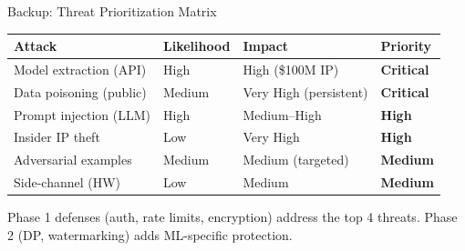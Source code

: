 \documentclass[aspectratio=169, 12pt]{beamer}
\begin{document}
\appendix

\begin{frame}{Backup: Threat Prioritization Matrix}

\footnotesize
\renewcommand{\arraystretch}{1.15}
\begin{tabular}{@{}llll@{}}
  \toprule
  \textbf{Attack} & \textbf{Likelihood} & \textbf{Impact} & \textbf{Priority} \\
  \midrule
  Model extraction (API)   & High   & High (\$100M IP)      & \textcolor{errorstroke}{\textbf{Critical}} \\
  Data poisoning (public)  & Medium & Very High (persistent) & \textcolor{errorstroke}{\textbf{Critical}} \\
  Prompt injection (LLM)   & High   & Medium--High           & \textcolor{routingstroke}{\textbf{High}} \\
  Insider IP theft         & Low    & Very High              & \textcolor{routingstroke}{\textbf{High}} \\
  Adversarial examples     & Medium & Medium (targeted)      & \textcolor{computestroke}{\textbf{Medium}} \\
  Side-channel (HW)        & Low    & Medium                 & \textcolor{computestroke}{\textbf{Medium}} \\
  \bottomrule
\end{tabular}

\vspace{0.15cm}
{\footnotesize Phase 1 defenses (auth, rate limits, encryption) address the top 4 threats. Phase 2 (DP, watermarking) adds ML-specific protection.}

\end{frame}
\end{document}
